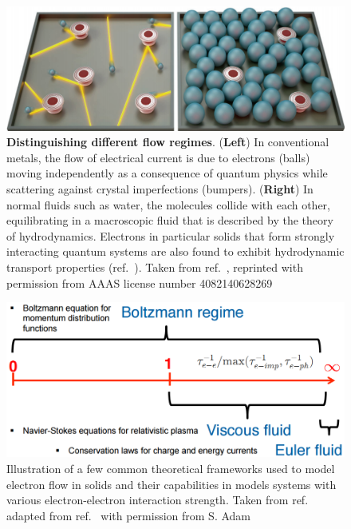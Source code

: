\begin{figure}
\centering
\includegraphics[width = 130mm]{figures/hydro_theory/cartoon_hydro.png}
\caption{\textbf{Distinguishing different flow regimes}. (\textbf{Left}) In conventional metals, the flow of electrical current is due to electrons (balls) moving independently as a consequence of quantum physics while scattering against crystal imperfections (bumpers). (\textbf{Right}) In normal fluids such as water, the molecules collide with each other, equilibrating in a macroscopic fluid that is described by the theory of hydrodynamics. Electrons in particular solids that form strongly interacting quantum systems are also found to exhibit hydrodynamic transport properties (ref.~\cite{crossno_observation_2016, bandurin_negative_2016, moll_evidence_2016}). Taken from ref.~\cite{zaanen_electrons_2016}, reprinted with permission from AAAS license number 4082140628269}
\end{figure}



\begin{figure}
\centering
\includegraphics[width = 130mm]{figures/hydro_theory/Boltzmann.png}
\caption{Illustration of a few common theoretical frameworks used to model electron flow in solids and their capabilities in models systems with various electron-electron interaction strength. Taken from ref.~\cite{adam_theoretical_2017} adapted from ref.~\cite{briskot_collision-dominated_2015} with permission from S. Adam}
\label{fig:Boltzmann_vs_hydro}
\end{figure}




